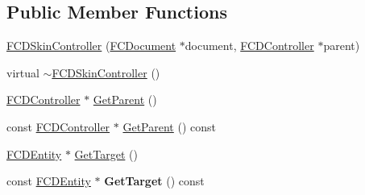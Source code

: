 \subsection*{Public Member Functions}
\begin{DoxyCompactItemize}
\item 
\hyperlink{classFCDSkinController_a15bfb70a67633c1a87e4ea887e1bff85}{FCDSkinController} (\hyperlink{classFCDocument}{FCDocument} $\ast$document, \hyperlink{classFCDController}{FCDController} $\ast$parent)
\item 
virtual \hyperlink{classFCDSkinController_ab8720fcc6fae0f933439f5f7d394395b}{$\sim$FCDSkinController} ()
\item 
\hyperlink{classFCDController}{FCDController} $\ast$ \hyperlink{classFCDSkinController_a17cb7af659591ec87e2839efb855446d}{GetParent} ()
\item 
const \hyperlink{classFCDController}{FCDController} $\ast$ \hyperlink{classFCDSkinController_ac81335d8b97084b4afad3f78c50c04fd}{GetParent} () const 
\item 
\hyperlink{classFCDEntity}{FCDEntity} $\ast$ \hyperlink{classFCDSkinController_afd496fa67e9cb8681b0e42ce77897a57}{GetTarget} ()
\item 
\hypertarget{classFCDSkinController_a1e4d760d8fa60f2cf41f87efcd46323f}{
const \hyperlink{classFCDEntity}{FCDEntity} $\ast$ {\bfseries GetTarget} () const }
\label{classFCDSkinController_a1e4d760d8fa60f2cf41f87efcd46323f}


\end{DoxyCompactItemize}
